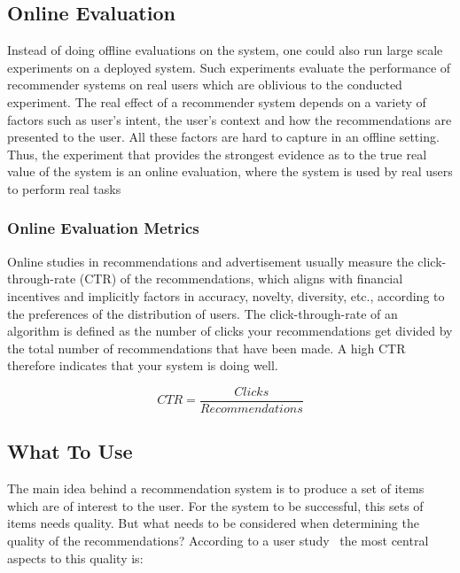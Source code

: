 
\subsection{Online Evaluation}

Instead of doing offline evaluations on the system, one could also run large
scale experiments on a deployed system. Such experiments evaluate the
performance of recommender systems on real users which are oblivious to the
conducted experiment. The real effect of a recommender system depends on a
variety of factors such as user’s intent, the user’s context and how the
recommendations are presented to the user. All these factors are hard to
capture in an offline setting. Thus, the experiment that provides the strongest
evidence as to the true real value of the system is an online evaluation, where
the system is used by real users to perform real tasks

\subsubsection{Online Evaluation Metrics}

Online studies in recommendations and advertisement usually measure the
click-through-rate (CTR) of the recommendations, which aligns with financial
incentives and implicitly factors in accuracy, novelty, diversity, etc.,
according to the preferences of the distribution of users.  The
click-through-rate of an algorithm is defined as the number of clicks your
recommendations get divided by the total number of recommendations that have
been made. A high CTR therefore indicates that your system is doing well.

\begin{equation}
CTR = \frac{Clicks}{Recommendations}
\end{equation}

\subsection{What To Use}

The main idea behind a recommendation system is to produce a set of items which are of interest to the user.
For the system to be successful, this sets of items needs quality.
But what needs to be considered when determining the quality of the recommendations?
According to a user study~\cite{Pu:2011:UEF:2043932.2043962} the most central aspects to this quality is:


